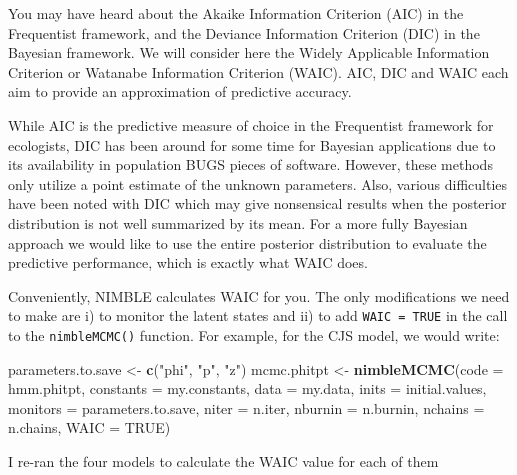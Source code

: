 \documentclass[
  12pt,
]{krantz}
\newenvironment{Shaded}{\begin{snugshade}}{\end{snugshade}}
\newcommand{\AttributeTok}[1]{\textcolor[rgb]{0.13,0.29,0.53}{#1}}
\newcommand{\ConstantTok}[1]{\textcolor[rgb]{0.56,0.35,0.01}{#1}}
\newcommand{\FunctionTok}[1]{\textcolor[rgb]{0.13,0.29,0.53}{\textbf{#1}}}
\newcommand{\NormalTok}[1]{#1}
\newcommand{\OtherTok}[1]{\textcolor[rgb]{0.56,0.35,0.01}{#1}}
\newcommand{\StringTok}[1]{\textcolor[rgb]{0.31,0.60,0.02}{#1}}
\begin{document}
You may have heard about the Akaike Information Criterion (AIC) in the Frequentist framework, and the Deviance Information Criterion (DIC) in the Bayesian framework. We will consider here the Widely Applicable Information Criterion or Watanabe Information Criterion (WAIC). AIC, DIC and WAIC each aim to provide an approximation of predictive accuracy.

While AIC is the predictive measure of choice in the Frequentist framework for ecologists, DIC has been around for some time for Bayesian applications due to its availability in population BUGS pieces of software. However, these methods only utilize a point estimate of the unknown parameters. Also, various difficulties have been noted with DIC which may give nonsensical results when the posterior distribution is not well summarized by its mean. For a more fully Bayesian approach we would like to use the entire posterior distribution to evaluate the predictive performance, which is exactly what WAIC does.

Conveniently, NIMBLE calculates WAIC for you. The only modifications we need to make are i) to monitor the latent states and ii) to add \texttt{WAIC\ =\ TRUE} in the call to the \texttt{nimbleMCMC()} function. For example, for the CJS model, we would write:

\begin{Shaded}
\begin{Highlighting}[]
\NormalTok{parameters.to.save }\OtherTok{\textless{}{-}} \FunctionTok{c}\NormalTok{(}\StringTok{"phi"}\NormalTok{, }\StringTok{"p"}\NormalTok{, }\StringTok{"z"}\NormalTok{) }
\NormalTok{mcmc.phitpt }\OtherTok{\textless{}{-}} \FunctionTok{nimbleMCMC}\NormalTok{(}\AttributeTok{code =}\NormalTok{ hmm.phitpt,}
                          \AttributeTok{constants =}\NormalTok{ my.constants,}
                          \AttributeTok{data =}\NormalTok{ my.data,}
                          \AttributeTok{inits =}\NormalTok{ initial.values,}
                          \AttributeTok{monitors =}\NormalTok{ parameters.to.save,}
                          \AttributeTok{niter =}\NormalTok{ n.iter,}
                          \AttributeTok{nburnin =}\NormalTok{ n.burnin,}
                          \AttributeTok{nchains =}\NormalTok{ n.chains,}
                          \AttributeTok{WAIC =} \ConstantTok{TRUE}\NormalTok{) }
\end{Highlighting}
\end{Shaded}

I re-ran the four models to calculate the WAIC value for each of them
\end{document}
